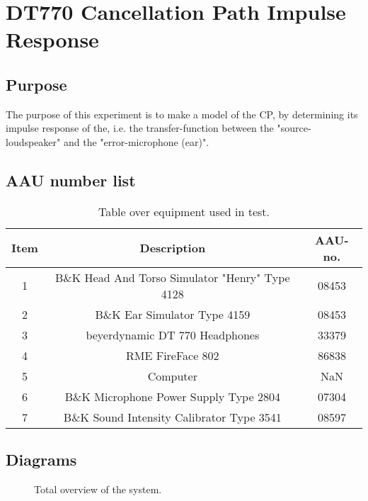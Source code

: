 \section{DT770 Cancellation Path Impulse Response} \label{sec:CPjournal}
\subsection{Purpose}
The purpose of this experiment is to make a model of the CP, by determining its impulse response of the, i.e. the transfer-function between the "source-loudspeaker" and the "error-microphone (ear)".
		
\subsection{AAU number list}
\begin{table}[h]
	\centering
	\begin{tabular}{ c c c } \toprule
		{Item}	& {Description} 						& {AAU-no}. \\ \bottomrule 
		1	&	B\&K Head And Torso Simulator "Henry" Type 4128	& 08453		\\
		2	&	B\&K Ear Simulator Type 4159			& 08453		\\
		3	&	beyerdynamic DT 770	Headphones			& 33379		\\
		4	&	RME FireFace 802		& 86838		\\
		5	&	Computer					& NaN		\\
		6	&	B\&K Microphone Power Supply Type 2804 	& 07304		\\
		7	&	B\&K Sound Intensity Calibrator Type 3541	& 08597	\\ \bottomrule
	\end{tabular}
	\caption{Table over equipment used in test.}
	\label{tab:UsedEquipmentListningCP}
\end{table}

\subsection{Diagrams}
\begin{figure}[H]
	\centering
	
	\caption{Total overview of the system.}
	\label{SchematicOverviewCP}
\end{figure}


